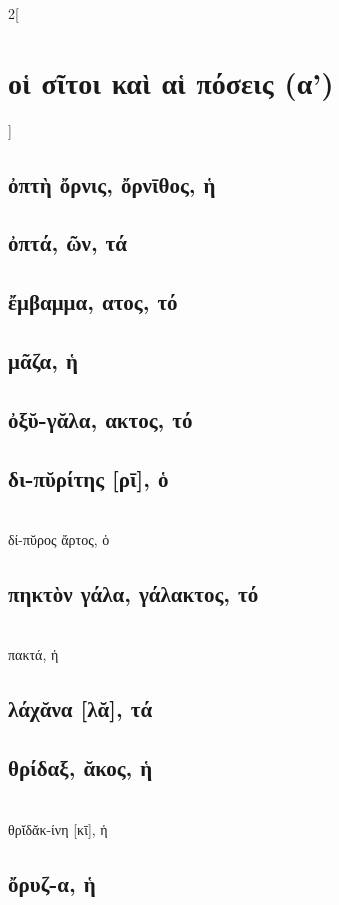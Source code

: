 \documentclass{book}
\begin{document}
\newpage  
\begin{multicols}{2}[\section{οἱ σῖτοι καὶ αἱ πόσεις (α')}]
\subsection{ὀπτὴ ὄρνις, ὄρνῑθος, ἡ}
\subsection{ὀπτά, ῶν, τά}
\subsection{ἔμβαμμα, ατος, τό}
\subsection{μᾶζα, ἡ}
\subsection{ὀξῠ-γᾰλα, ακτος, τό}
\subsection{δι-πῠρίτης [ρῑ], ὁ}
 ~\\
δί-πῠρος ἄρτος, ὁ
\subsection{πηκτὸν γάλα, γάλακτος, τό}
 ~\\
πακτά, ἡ
\subsection{λάχᾰνα [λᾰ], τά}
\subsection{θρίδαξ, ᾰκος, ἡ}
 ~\\ 
θρῐδᾰκ-ίνη [κῑ], ἡ
\subsection{ὄρυζ-α, ἡ}

\end{multicols}
\end{document}

